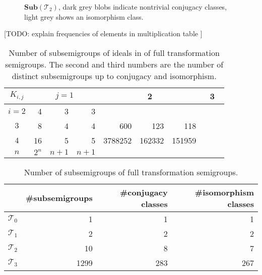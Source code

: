 \documentclass{amsart}
\newcommand{\cT}{{\mathcal T}}
\newcommand{\Sub}{\mathbf{Sub}}
\newcommand{\todo}[1]{ \small \textsf{[TODO:  #1 ]} \normalsize}
\theoremstyle{plain}
\theoremstyle{definition}
\begin{document}
\begin{figure}

\caption{$\Sub(\cT_2)$, dark grey blobs indicate nontrivial conjugacy classes, light grey shows an isomorphism class.}
\label{fig:T2subs}
\end{figure}
\todo{explain frequencies of elements in multiplication table}


\begin{table}
\renewcommand{\arraystretch}{1}
\begin{tabular}{|c|r|r|r||r|r|r||r|r|r|}
\hline
$K_{i,j}$ & \multicolumn{3}{c||}{$j=1$} & \multicolumn{3}{c||}{2} & \multicolumn{3}{c|}{3} \\
\hline
$i=2$ & 4&3&3   & \cellcolor{lgr}  & \cellcolor{lgr}&  \cellcolor{lgr} & \cellcolor{lgr}  &\cellcolor{lgr} &\cellcolor{lgr}\\
\hline
$3$ &  8&4&4  &  600 & 123 & 118  & \cellcolor{lgr}  & \cellcolor{lgr}&\cellcolor{lgr}\\
\hline
$4$ & 16&5&5  &  3788252 & 162332 & 151959  &   & &\\
\hline
$n$ & $2^n$&$n+1$&$n+1$    &    & &    &    & & \\
\hline

\end{tabular}
\caption{Number of subsemigroups of ideals in of full transformation semigroups. The second and third numbers are the number of distinct subsemigroups up to conjugacy and isomorphism.}
\end{table}


\begin{table}
\renewcommand{\arraystretch}{1}
\begin{tabular}{|c|r|r|r|}
\hline
 & \#subsemigroups & \#conjugacy classes & \#isomorphism classes \\
\hline
$\cT_0$ & 1  & 1 & 1\\
\hline
$\cT_1$ & 2  & 2 & 2\\
\hline
$\cT_2$ & 10  & 8 & 7\\
\hline
$\cT_3$ & 1299 & 283 & 267\\
\hline
\end{tabular}
\caption{Number of subsemigroups of full transformation semigroups.}
\end{table}



\end{document}
